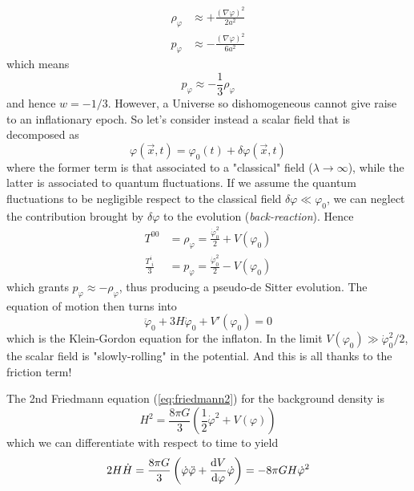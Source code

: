 \begin{align}
    \rho_{\varphi} &\approx + \frac{(\nabla\varphi)^{2}}{2a^{2}}\\
    p_{\varphi} &\approx -\frac{(\nabla\varphi)^{2}}{6a^{2}}
\end{align}
which means 
\begin{equation}
    p_{\varphi} \approx - \frac{1}{3}\rho_{\varphi}
\end{equation}
and hence $w = -1/3$. However, a Universe so dishomogeneous cannot give raise to an inflationary epoch. So let's consider instead a scalar field that is decomposed as 
\begin{equation}
    \varphi(\vec{x},t) = \varphi_{0}(t) + \delta\varphi(\vec{x},t)
\end{equation}
where the former term is that associated to a "classical" field ($\lambda \to \infty$), while the latter is associated to quantum fluctuations. If we assume the quantum fluctuations to be negligible respect to the classical field $\delta\varphi \ll \varphi_{0}$, we can neglect the contribution brought by $\delta\varphi$ to the evolution (\emph{back-reaction}). Hence
\begin{align}
    T^{00} &= \rho_{\varphi} = \frac{\dot{\varphi}_{0}^{2}}{2} + V(\varphi_{0})\\
    \frac{T^{i}_{\;i}}{3} &= p_{\varphi} = \frac{\dot{\varphi}_{0}^{2}}{2} - V(\varphi_{0})
\end{align}
which grants $p_{\varphi} \approx - \rho_{\varphi}$, thus producing a pseudo-de Sitter evolution. The equation of motion then turns into
\begin{equation}
    \boxed{
        \ddot{\varphi}_{0} +3H\dot{\varphi}_{0} + V'(\varphi_{0}) = 0
    }
    \label{eq:inflatoneom}
\end{equation}
which is the Klein-Gordon equation for the inflaton. In the limit $V(\varphi_{0}) \gg \dot{\varphi}_{0}^{2}/2$, the scalar field is "slowly-rolling" in the potential. And this is all thanks to the friction term!
\par The 2nd Friedmann equation (\ref{eq:friedmann2}) for the background density is 
\begin{equation}
    H^{2} = \frac{8\pi G}{3}\left(\frac{1}{2}\dot{\varphi}^{2}+V(\varphi)\right)
    \label{eq:fried_altalt}
\end{equation}
which we can differentiate with respect to time to yield 
\begin{equation}
    2H\dot{H} = \frac{8\pi G}{3}\left(\dot{\varphi}\ddot{\varphi}+\frac{\text{d}V}{\text{d}\varphi}\dot{\varphi}\right) = -8\pi G H \dot{\varphi}^{2}
\end{equation}
